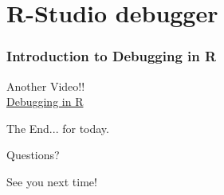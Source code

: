 \documentclass{beamer}
\begin{document}
\section{R-Studio debugger} 

\begin{frame}
	\frametitle{Introduction to Debugging in R}
	\begin{center}
		Another Video!! \\
		\href{https://vimeo.com/99375765}{Debugging in R}
	\end{center}
\end{frame}


\begin{frame}
\Huge{\centerline{The End... for today.}}
\Huge{\centerline{Questions?}}
\Huge{\centerline{See you next time!}}
\end{frame}

\end{document}
